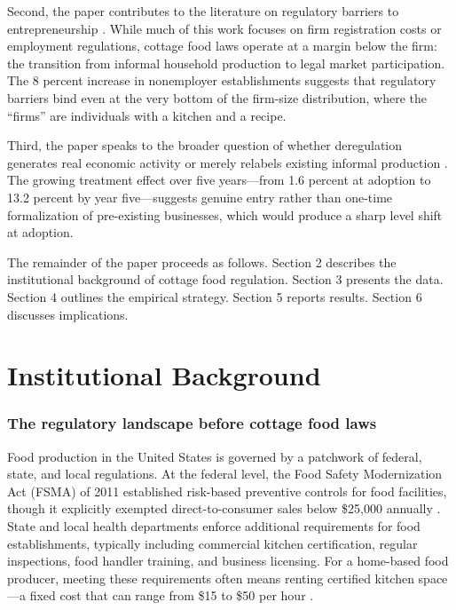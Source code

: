 \documentclass[12pt]{article}
\begin{document}
Second, the paper contributes to the literature on regulatory barriers to entrepreneurship \citep{djankov2002regulation, branstetter2014regulation, bailey2019regulation}. While much of this work focuses on firm registration costs or employment regulations, cottage food laws operate at a margin below the firm: the transition from informal household production to legal market participation. The 8 percent increase in nonemployer establishments suggests that regulatory barriers bind even at the very bottom of the firm-size distribution, where the ``firms'' are individuals with a kitchen and a recipe.

Third, the paper speaks to the broader question of whether deregulation generates real economic activity or merely relabels existing informal production \citep{lafortune2018people, ulyssea2018firms}. The growing treatment effect over five years---from 1.6 percent at adoption to 13.2 percent by year five---suggests genuine entry rather than one-time formalization of pre-existing businesses, which would produce a sharp level shift at adoption.

The remainder of the paper proceeds as follows. Section 2 describes the institutional background of cottage food regulation. Section 3 presents the data. Section 4 outlines the empirical strategy. Section 5 reports results. Section 6 discusses implications.


\section{Institutional Background}

\subsubsection*{The regulatory landscape before cottage food laws} Food production in the United States is governed by a patchwork of federal, state, and local regulations. At the federal level, the Food Safety Modernization Act (FSMA) of 2011 established risk-based preventive controls for food facilities, though it explicitly exempted direct-to-consumer sales below \$25,000 annually \citep{fsma2011}. State and local health departments enforce additional requirements for food establishments, typically including commercial kitchen certification, regular inspections, food handler training, and business licensing. For a home-based food producer, meeting these requirements often means renting certified kitchen space---a fixed cost that can range from \$15 to \$50 per hour \citep{cottagefoodlaws2023}.
\end{document}
